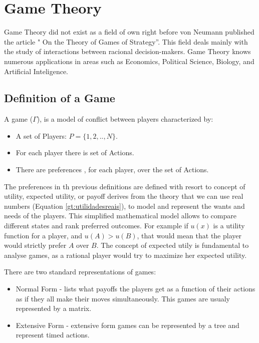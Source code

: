 \section{Game Theory}
\label{sec:background:game_theory}

Game Theory did not exist as a field of own right before von Neumann published the article " On the Theory of Games of Strategy''. This field deals mainly with the study of interactions between racional decision-makers\cite{Neumann1944}. Game Theory knows numerous applications in areas such as Economics, Political Science, Biology, and Artificial Inteligence. 

\subsection{Definition of a Game}
\label{subsec:background:game_theory_definition}

A game ($\Gamma$), is a model of conflict between players characterized by\cite{Osborne2004}\cite{OsbRub94}\cite{Fra2011}:
\begin{itemize}
\item A set of Players: $P=\{1, 2, .., N \}$.
\item For each player there is set of Actions.
\item There are preferences , for each player, over the set of Actions.
\end{itemize}

The preferences in th previous definitions are defined with resort to concept of utility, expected utility, or payoff derives from the theory that we can use real numbers (Equation \ref{gt:utilidadesreais}), to model and represent the wants and needs of the players. This simplified mathematical model allows to compare different states and rank preferred outcomes. For example if $u(x)$ is a utility function for a player, and $u(A)>u(B)$, that would mean that the player would strictly prefer $A$ over $B$. The concept of expected utily is fundamental to analyse games, as a rational player would try to maximize her expected utility\cite{Neumann1944}\cite{Osborne2004}.

There are two standard representations of games:
\begin{itemize}
\item Normal Form - lists what payoffs the players get as a function of their actions as if they all make their moves simultaneously. This games are usualy represented by a matrix.
\item Extensive Form - extensive form games can be represented by a tree and represent timed actions.
\end{itemize}


